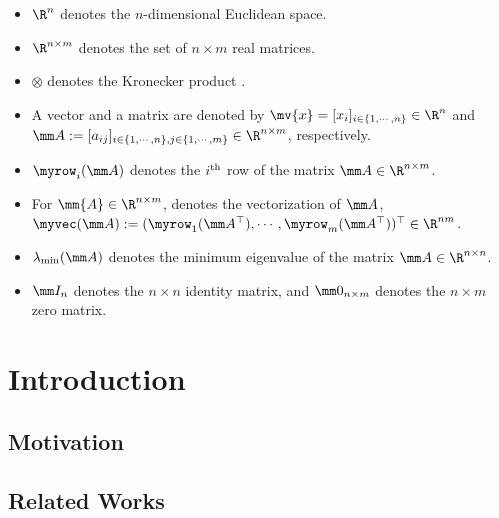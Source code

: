 \documentclass[lettersize,journal]{IEEEtran}
\begin{document}
\begin{itemize}
    \item $\R^n$ denotes the $n$-dimensional Euclidean space.
    \item $\R^{n\times m}$ denotes the set of $n\times m$ real matrices.
    \item $\otimes$ denotes the Kronecker product \cite[Chap. 7 Def. 7.1.2]{Bernstein:2009aa}.
    \item A vector and a matrix are denoted by $\mv{x}=[x_i]_{i\in\{1,\cdots,n\}}\in\R^n$ and $
        \mm A
        := 
        [a_{ij}]
        _{
            i\in\{1,\cdots,n\},j\in\{1,\cdots ,m\}
        }\allowbreak\in\R^{n\times m}
        $, respectively.
    \item $\myrow_i(\mm A)$ denotes the $i\textsuperscript{th}$ row of the matrix $\mm A\in\R^{n\times m}$. 
    \item For $\mm{A}\in\R^{n\times m}$, denotes the vectorization of $\mm A$, $\myvec(\mm A):=(\myrow_1(\mm A^\top),\cdots,\myrow_m(\mm A^\top)  )^\top\in\R^{nm}$.
    \item $\lambda_{\min}(\mm A)$ denotes the minimum eigenvalue of the matrix $\mm A\in\R^{n\times n}$.
    \item $\mm I_n$ denotes the $n\times n$ identity matrix, and $\mm 0_{n\times m}$ denotes the $n\times m$ zero matrix.
\end{itemize}

\section{Introduction}
\label{sec:intro}

\subsection{Motivation}

\subsection{Related Works}
\end{document}
